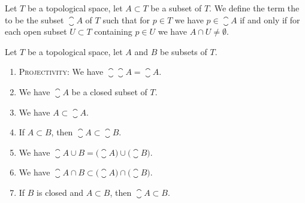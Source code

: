 
\begin{definition}
Let $T$ be a topological space, let $A\subset T$ be a subset of $T$.
We define the term the  to be the subset
$\closure{A}$ of $T$ such that
for $p\in T$ we have $p\in\closure{A}$ if and only if for each open
subset $U\subset T$ containing $p\in U$ we have $A\cap U\neq\emptyset$.
\end{definition}

\begin{theorem}
Let $T$ be a topological space, let $A$ and $B$ be subsets of $T$.
\begin{enumerate}
\item\textsc{Projectivity:} We have $\closure{\closure{A}}=\closure{A}$.
\item We have $\closure{A}$ be a closed subset of $T$.
\item{} We have $A\subset\closure{A}$.
\item{} If $A\subset B$, then $\closure{A}\subset\closure{B}$.
\item{} We have $\closure{A\cup B}=\bigl(\closure{A}\bigr)\cup\bigl(\closure{B}\bigr)$.
\item{} We have $\closure{A\cap B}\subset\bigl(\closure{A}\bigr)\cap\bigl(\closure{B}\bigr)$.
\item{} If $B$ is closed and $A\subset B$, then $\closure{A}\subset B$.
\end{enumerate}
\end{theorem}

